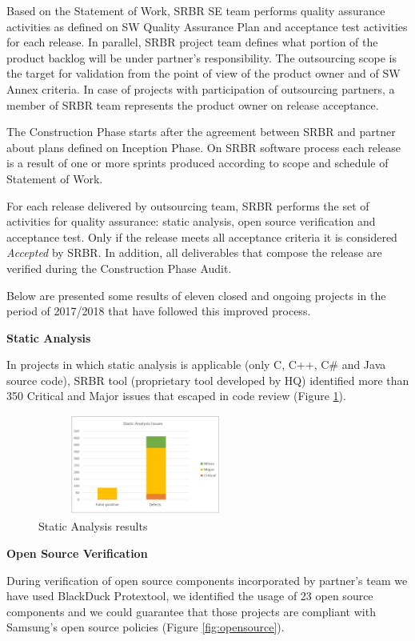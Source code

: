 Based on the Statement of Work, SRBR SE team performs quality assurance activities as defined on SW Quality Assurance Plan and acceptance test activities for each release. In parallel, SRBR project team defines
what portion of the product backlog will be under partner's responsibility. The outsourcing scope is the target for validation from the point of view of the product owner and of SW Annex criteria. In case of projects with participation of outsourcing partners, a member of SRBR team represents the product owner on release acceptance. 

The Construction Phase starts after the agreement between SRBR and partner about plans defined on Inception Phase. On SRBR software process each release is a result of one or more sprints produced according to scope and schedule of Statement of Work. 

For each release delivered by outsourcing team, SRBR performs the set of activities for quality assurance: static analysis, open source verification and acceptance test. Only if the release meets all acceptance criteria it is considered \textit{Accepted} by SRBR. In addition, all deliverables that compose the release are verified during the Construction Phase Audit. 

Below are presented some results of eleven closed and ongoing projects in the period of 2017/2018 that have followed this improved process.

\textbf{Static Analysis}

In projects in which static analysis is applicable (only C, C++, C\# and Java source code), SRBR tool (proprietary tool developed by HQ) identified more than 350 Critical and Major issues that escaped in code review (Figure \ref{fig:static-analysis}).

\begin{figure}[!h]
\includegraphics[height=1.3in, width=2.8in]{StaticAnalysis}
\caption{Static Analysis results}
\label{fig:static-analysis}
\end{figure}

\textbf{Open Source Verification}

During verification of open source components incorporated by partner's team we have used BlackDuck Protex\texttrademark tool\cite{Protex}, we identified the usage of 23 open source components and we could guarantee that those projects are compliant with Samsung's open source policies (Figure \ref{fig:opensource}).

